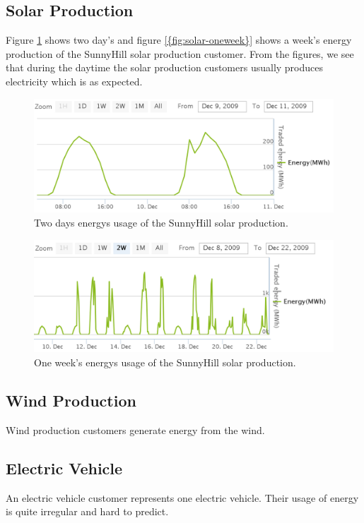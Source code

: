 \subsection{Solar Production}
Figure \ref{fig:solar-twoday} shows two day's and  figure \ref{{fig:solar-oneweek}} shows a week's energy production of the SunnyHill solar production customer. From the figures, we see that during the daytime the solar production customers usually produces electricity which is as expected.

\begin{figure}[h!]
  \includegraphics[width=\linewidth]{sunnyhill-twoday.png}
  \caption{Two days energys usage of the SunnyHill solar production.}
  \label{fig:solar-twoday}
\end{figure}


\begin{figure}[h!]
  \includegraphics[width=\linewidth]{sunnyhill-oneweek.png}
  \caption{One week's energys usage of the SunnyHill solar production.}
  \label{fig:solar-oneweek}
\end{figure}

\subsection{Wind Production}
Wind production customers generate energy from the wind.
\subsection {Electric Vehicle}
An electric vehicle customer represents one electric vehicle. Their usage of energy is quite irregular and hard to predict.

